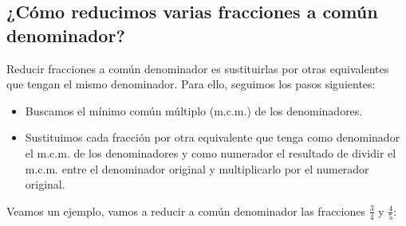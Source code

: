 \subsection{¿Cómo reducimos varias fracciones a común denominador?}

Reducir fracciones a común denominador es sustituirlas por otras equivalentes que tengan el mismo denominador. Para ello, seguimos los pasos siguientes:

\begin{itemize}
    \item Buscamos el mínimo común múltiplo (m.c.m.) de los denominadores.
    \item Sustituimos cada fracción por otra equivalente que tenga como denominador el m.c.m. de los denominadores y como numerador el resultado de dividir el m.c.m. entre el denominador original y multiplicarlo por el numerador original.
\end{itemize}

Veamos un ejemplo, vamos a reducir a común denominador las fracciones $\displaystyle \frac{3}{4}$ y $\displaystyle \frac{4}{5}$:

